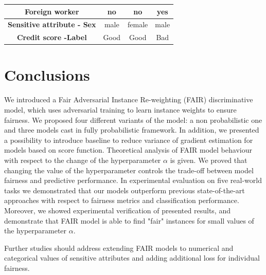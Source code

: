 \documentclass[preprint,12pt]{elsarticle}
\begin{document}
\begin{table}
{\begin{tabular}{|c|c|c|c|}
		\textbf{Foreign worker}                                  & no                         & no                                                                                   & yes                                                                                  \\ \hline
		\textbf{Sensitive attribute - Sex}                                             & male                       & female                                                                               & male                                                                                 \\ \hline
		\textbf{Credit score -Label}                                           & Good                       & Good                                                                                 & Bad                                                                                  \\ \hline
	\end{tabular}}
	\label{tab:Explainability}
\end{table}

\section{Conclusions}
\label{Sec:Conclusion}
We introduced a Fair Adversarial Instance Re-weighting (FAIR) discriminative model, which uses adversarial training to learn instance weights to ensure fairness. We proposed four different variants of the model: a non probabilistic one and three models cast in fully probabilistic framework. In addition, we presented a possibility to introduce baseline to reduce variance of gradient estimation for models based on score function. Theoretical analysis of FAIR model behaviour with respect to the change of the hyperparameter $\alpha$ is given. We proved that changing the value of the hyperparameter controls the trade-off between model fairness and predictive performance. In experimental evaluation on five real-world tasks we demonstrated that our models outperform previous state-of-the-art approaches with respect to fairness metrics and classification performance. Moreover, we showed experimental verification of presented results, and demonstrate that FAIR model is able to find "fair" instances for small values of the hyperparameter $\alpha$. 

Further studies should address extending FAIR models to numerical and categorical values of sensitive attributes and adding additional loss for individual fairness.
\end{document}
